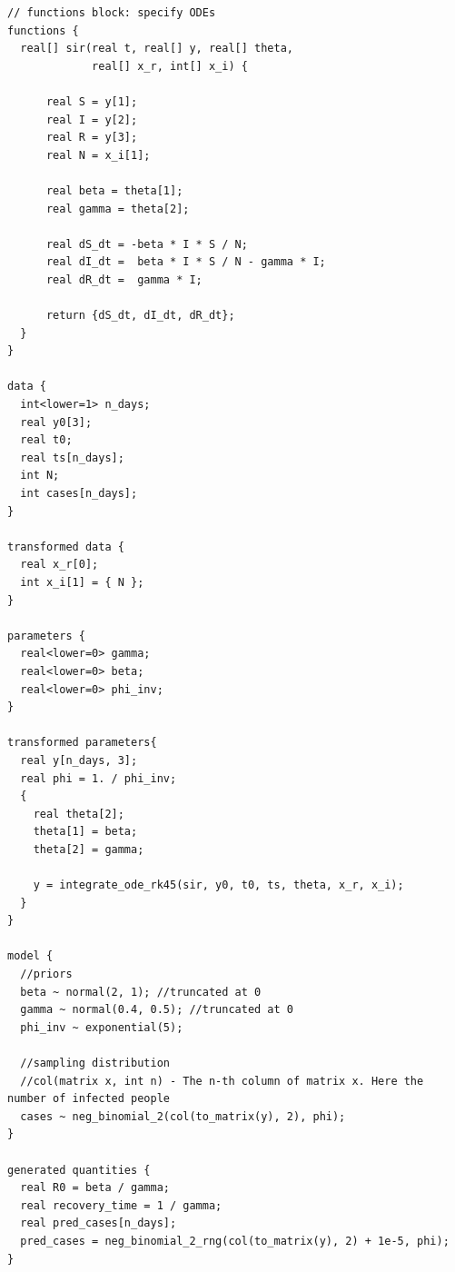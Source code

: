 \documentclass[
]{book}
\newenvironment{Shaded}{\begin{snugshade}}{\end{snugshade}}
\newcommand{\CommentTok}[1]{\textcolor[rgb]{0.56,0.35,0.01}{\textit{#1}}}
\begin{document}
\begin{verbatim}
// functions block: specify ODEs
functions {
  real[] sir(real t, real[] y, real[] theta, 
             real[] x_r, int[] x_i) {

      real S = y[1];
      real I = y[2];
      real R = y[3];
      real N = x_i[1];
      
      real beta = theta[1];
      real gamma = theta[2];
      
      real dS_dt = -beta * I * S / N;
      real dI_dt =  beta * I * S / N - gamma * I;
      real dR_dt =  gamma * I;
      
      return {dS_dt, dI_dt, dR_dt};
  }
}

data {
  int<lower=1> n_days;
  real y0[3];
  real t0;
  real ts[n_days];
  int N;
  int cases[n_days];
}

transformed data {
  real x_r[0];
  int x_i[1] = { N };
}

parameters {
  real<lower=0> gamma;
  real<lower=0> beta;
  real<lower=0> phi_inv;
}

transformed parameters{
  real y[n_days, 3];
  real phi = 1. / phi_inv;
  {
    real theta[2];
    theta[1] = beta;
    theta[2] = gamma;

    y = integrate_ode_rk45(sir, y0, t0, ts, theta, x_r, x_i);
  }
}

model {
  //priors
  beta ~ normal(2, 1); //truncated at 0
  gamma ~ normal(0.4, 0.5); //truncated at 0
  phi_inv ~ exponential(5);
  
  //sampling distribution
  //col(matrix x, int n) - The n-th column of matrix x. Here the number of infected people
  cases ~ neg_binomial_2(col(to_matrix(y), 2), phi);
}

generated quantities {
  real R0 = beta / gamma;
  real recovery_time = 1 / gamma;
  real pred_cases[n_days];
  pred_cases = neg_binomial_2_rng(col(to_matrix(y), 2) + 1e-5, phi);
}
\end{verbatim}

\begin{Shaded}
\end{Shaded}
\end{document}
